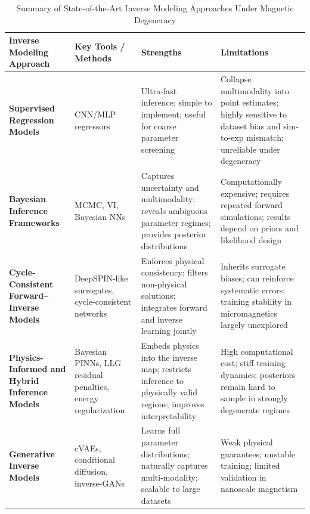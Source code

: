 \documentclass[letterpaper, 12, one column]{article}
\begin{document}
\begin{table}[H]
\centering
\footnotesize
\caption{Summary of State-of-the-Art Inverse Modeling Approaches Under Magnetic Degeneracy}
\label{tab:sota_inverse_magnetism}
\begin{tabularx}{\textwidth}{@{} p{3.2cm} | p{2.2cm} | X | X @{}}
\toprule
\textbf{Inverse Modeling Approach} & \textbf{Key Tools / Methods} & \textbf{Strengths} & \textbf{Limitations} \\
\midrule

\textbf{Supervised Regression Models} 
& CNN/MLP regressors \cite{Feng2024} 
& Ultra-fast inference; simple to implement; useful for coarse parameter screening 
& Collapse multimodality into point estimates; highly sensitive to dataset bias and sim-to-exp mismatch; unreliable under degeneracy \\

\midrule

\textbf{Bayesian Inference Frameworks}
& MCMC, VI, Bayesian NNs
& Captures uncertainty and multimodality; reveals ambiguous parameter regimes; provides posterior distributions
& Computationally expensive; requires repeated forward simulations; results depend on priors and likelihood design \\

\midrule

\textbf{Cycle-Consistent Forward--Inverse Models}
& DeepSPIN-like surrogates, cycle-consistent networks
& Enforces physical consistency; filters non-physical solutions; integrates forward and inverse learning jointly
& Inherits surrogate biases; can reinforce systematic errors; training stability in micromagnetics largely unexplored \\

\midrule

\textbf{Physics-Informed and Hybrid Inference Models}
& Bayesian PINNs, LLG residual penalties, energy regularization
& Embeds physics into the inverse map; restricts inference to physically valid regions; improves interpretability
& High computational cost; stiff training dynamics; posteriors remain hard to sample in strongly degenerate regimes \\

\midrule

\textbf{Generative Inverse Models} 
& cVAEs, conditional diffusion, inverse-GANs 
& Learns full parameter distributions; naturally captures multi-modality; scalable to large datasets 
& Weak physical guarantees; unstable training; limited validation in nanoscale magnetism \\

\bottomrule
\end{tabularx}
\end{table}
\end{document}

